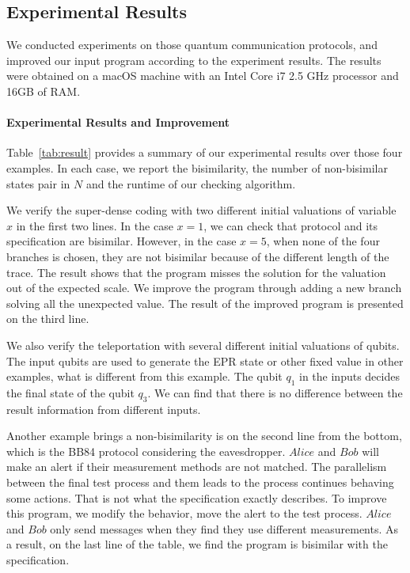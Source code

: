 \documentclass[a4paper,UKenglish,cleveref, autoref]{lipics-v2019}
\begin{document}
\subsection{Experimental Results}
We conducted experiments on those quantum communication protocols, and improved our input program according to the experiment results. The results were obtained on a macOS machine with an Intel Core i7 2.5 GHz processor and 16GB of RAM.
\paragraph*{Experimental Results and Improvement}Table~\ref{tab:result} provides a summary of our experimental results over those four examples. In each case, we report the bisimilarity, the number of non-bisimilar states pair in $N$ and the runtime of our checking algorithm.

We verify the super-dense coding with two different initial valuations of variable $x$ in the first two lines. In the case $x=1$, we can check that protocol and its specification are bisimilar. However, in the case $x=5$, when none of the four branches is chosen, they are not bisimilar because of the different length of the trace. The result shows that the program misses the solution for the valuation out of the expected scale. We improve the program through adding a new branch solving all the unexpected value. The result of the improved program is presented on the third line. 

We also verify the teleportation with several different initial valuations of qubits. The input qubits are used to generate the EPR state or other fixed value in other examples, what is different from this example. The qubit $q_1$ in the inputs decides the final state of the qubit $q_3$. We can find that there is no difference between the result information from different inputs.

Another example brings a non-bisimilarity is on the second line from the bottom, which is the BB84 protocol considering the eavesdropper. $Alice$ and $Bob$ will make an alert if their measurement methods are not matched. The parallelism between the final test process and them leads to the process continues behaving some actions. That is not what the specification exactly describes. To improve this program, we modify the behavior, move the alert to the test process. $Alice$ and $Bob$ only send messages when they find they use different measurements. As a result, on the last line of the table, we find the program is bisimilar with the specification.
\end{document}
